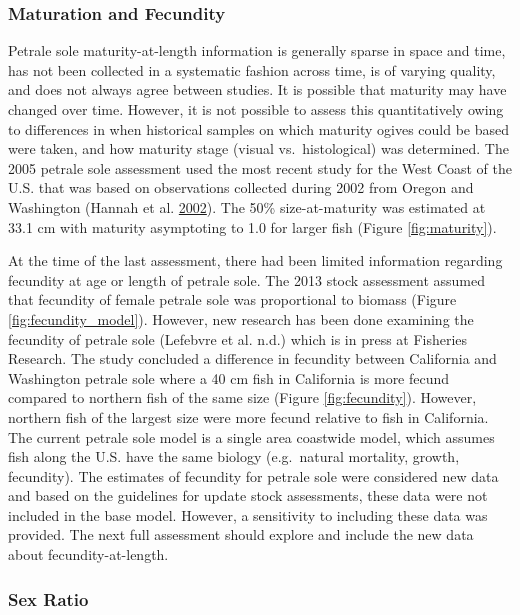 \documentclass[12pt,]{article}
\begin{document}
\hypertarget{mat_fecund}{\subsubsection{Maturation and
Fecundity}\label{mat_fecund}}

Petrale sole maturity-at-length information is generally sparse in space
and time, has not been collected in a systematic fashion across time, is
of varying quality, and does not always agree between studies. It is
possible that maturity may have changed over time. However, it is not
possible to assess this quantitatively owing to differences in when
historical samples on which maturity ogives could be based were taken,
and how maturity stage (visual vs.~histological) was determined. The
2005 petrale sole assessment used the most recent study for the West
Coast of the U.S. that was based on observations collected during 2002
from Oregon and Washington (Hannah et al.
\protect\hyperlink{ref-hannah_length_2002}{2002}). The 50\%
size-at-maturity was estimated at 33.1 cm with maturity asymptoting to
1.0 for larger fish (Figure \ref{fig:maturity}).

At the time of the last assessment, there had been limited information
regarding fecundity at age or length of petrale sole. The 2013 stock
assessment assumed that fecundity of female petrale sole was
proportional to biomass (Figure \ref{fig:fecundity_model}). However, new
research has been done examining the fecundity of petrale sole (Lefebvre
et al. n.d.) which is in press at Fisheries Research. The study
concluded a difference in fecundity between California and Washington
petrale sole where a 40 cm fish in California is more fecund compared to
northern fish of the same size (Figure \ref{fig:fecundity}). However,
northern fish of the largest size were more fecund relative to fish in
California. The current petrale sole model is a single area coastwide
model, which assumes fish along the U.S. have the same biology
(e.g.~natural mortality, growth, fecundity). The estimates of fecundity
for petrale sole were considered new data and based on the guidelines
for update stock assessments, these data were not included in the base
model. However, a sensitivity to including these data was provided. The
next full assessment should explore and include the new data about
fecundity-at-length.

\subsubsection{Sex Ratio}\label{sex-ratio}
\end{document}
